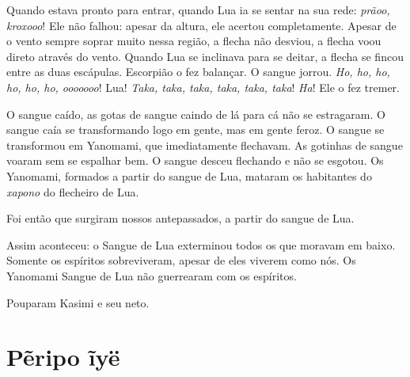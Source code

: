 

Quando estava pronto para entrar, quando Lua ia se sentar na sua
rede: \textit{prãoo, kroxooo}! Ele não falhou: apesar da altura, ele
acertou completamente. Apesar de o vento sempre soprar muito nessa região,
a flecha não desviou, a flecha voou direto através do vento. Quando Lua se inclinava para se deitar, a flecha se fincou entre as duas
escápulas. Escorpião o fez balançar. O sangue jorrou. \textit{Ho, ho, ho,
ho, ho, ho, ooooooo}! Lua! \textit{Taka, taka, taka, taka, taka,
taka}! \textit{Ha}! Ele o fez tremer. 

O sangue caído, as gotas de sangue caindo de lá para cá não se
estragaram. O sangue caía se transformando logo em gente, mas em
gente feroz. O sangue se transformou em Yanomami, que imediatamente
flechavam. As gotinhas de sangue voaram sem se espalhar bem. O sangue
desceu flechando e não se esgotou. Os Yanomami, formados a partir
do sangue de Lua, mataram os habitantes do \textit{xapono} do flecheiro de Lua. 


Foi então que surgiram nossos antepassados, a partir do sangue de Lua. 

Assim aconteceu: o Sangue de Lua exterminou todos os que moravam em
baixo. Somente os espíritos sobreviveram, apesar de eles viverem como
nós. Os Yanomami Sangue de Lua não guerrearam com os espíritos.

Pouparam Kasimi e seu neto. 

\chapter{Pẽripo ĩyë}

  

